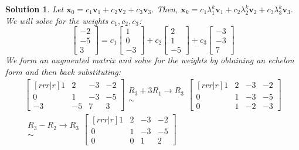 \documentclass[11pt]{scrartcl}
\theoremstyle{dotlessP}
\newtheorem{sol}{Solution}[section]
\theoremstyle{dotlessN}
\begin{document}
\begin{sol}
	Let $\bm{x}_0 = c_1\bm{v}_1 + c_2\bm{v}_2 + c_3\bm{v}_3$. Then, $\bm{x}_{k} = c_1\lambda_1^{k}\bm{v}_1 + c_2\lambda_2^{k}\bm{v}_2 + c_3\lambda_3^{k}\bm{v}_3$. We will solve for the weights $c_1, c_2, c_3$:
	\[
	\begin{bmatrix}
		-2 \\
		-5 \\
		3
	\end{bmatrix} =c_1
	\begin{bmatrix}
		1 \\
		0 \\
		-3
	\end{bmatrix} +
	c_2
	\begin{bmatrix}
		2 \\
		1 \\
		-5
	\end{bmatrix} +
	c_3
	\begin{bmatrix}
		-3 \\
		-3 \\
		7
	\end{bmatrix}
	\] 
	We form an augmented matrix and solve for the weights by obtaining an echelon form and then back substituting:
	\begin{align*}
		\begin{bmatrix}[rrr|r]
			1 & 2 & -3 & -2 \\
			0 & 1 & -3 & -5 \\
			-3 & -5 & 7 & 3
		\end{bmatrix} 
		\begin{array}{c}
			R_3 + 3R_1 \to R_3 \\
			\sim
		\end{array}
		\begin{bmatrix}[rrr|r]
			1 & 2 & -3 & -2 \\
			0 & 1 & -3 & -5 \\
			0 & 1 & -2 & -3
		\end{bmatrix} \\
		\begin{array}{c}
			R_3 - R_2 \to R_3 \\
			\sim
		\end{array}
\begin{bmatrix}[rrr|r]
			1 & 2 & -3 & -2 \\
			0 & 1 & -3 & -5 \\
			0 & 0 & 1 & 2
		\end{bmatrix}
	\end{align*}
	\begin{align*}

\end{align*}
\end{sol}
\end{document}
